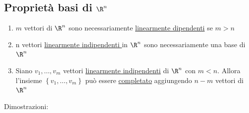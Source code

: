 \subsection{Proprietà basi di $\R^{n}$}
\label{sub::proprietàbasi}
\begin{enumerate}
	\item $m$ vettori di $\R^{n}$ sono necessariamente \underline{linearmente dipendenti} se $m > n$
	\item n vettori \underline{linearmente indipendenti }in $\R^{n}$ sono necessariamente una base di $\R^{n}$
	\item Siano $v_1,\ldots, v_m$ vettori \underline{linearmente indipendenti} di $\R^{n}$ con $m<n$. Allora l'insieme $\left\{ v_1,\ldots,v_m \right\} $ può essere \underline{completato} aggiungendo $n-m$ vettori di $ \R^{n}$
\end{enumerate}
Dimostrazioni:
